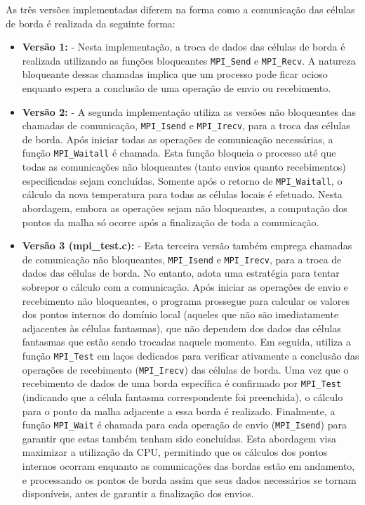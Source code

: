 \documentclass[a4paper, 12pt]{article}
\begin{document}
	As três versões implementadas diferem na forma como a comunicação das células de borda é realizada da seguinte forma:
	
	\begin{itemize}
		\item \textbf{Versão 1:} - Nesta implementação, a troca de dados das células de borda é realizada utilizando as funções bloqueantes \texttt{MPI\_Send} e \texttt{MPI\_Recv}. A natureza bloqueante dessas chamadas implica que um processo pode ficar ocioso enquanto espera a conclusão de uma operação de envio ou recebimento.
		
		\item \textbf{Versão 2:} - A segunda implementação utiliza as versões não bloqueantes das chamadas de comunicação, \texttt{MPI\_Isend} e \texttt{MPI\_Irecv}, para a troca das células de borda. Após iniciar todas as operações de comunicação necessárias, a função \texttt{MPI\_Waitall} é chamada. Esta função bloqueia o processo até que todas as comunicações não bloqueantes (tanto envios quanto recebimentos) especificadas sejam concluídas. Somente após o retorno de \texttt{MPI\_Waitall}, o cálculo da nova temperatura para todas as células locais é efetuado. Nesta abordagem, embora as operações sejam não bloqueantes, a computação dos pontos da malha só ocorre após a finalização de toda a comunicação.
		
		\item \textbf{Versão 3 (mpi\_test.c):} - Esta terceira versão também emprega chamadas de comunicação não bloqueantes, \texttt{MPI\_Isend} e \texttt{MPI\_Irecv}, para a troca de dados das células de borda. No entanto, adota uma estratégia para tentar sobrepor o cálculo com a comunicação. Após iniciar as operações de envio e recebimento não bloqueantes, o programa prossegue para calcular os valores dos pontos internos do domínio local (aqueles que não são imediatamente adjacentes às células fantasmas), que não dependem dos dados das células fantasmas que estão sendo trocadas naquele momento. Em seguida, utiliza a função \texttt{MPI\_Test} em laços dedicados para verificar ativamente a conclusão das operações de recebimento (\texttt{MPI\_Irecv}) das células de borda. Uma vez que o recebimento de dados de uma borda específica é confirmado por \texttt{MPI\_Test} (indicando que a célula fantasma correspondente foi preenchida), o cálculo para o ponto da malha adjacente a essa borda é realizado. Finalmente, a função \texttt{MPI\_Wait} é chamada para cada operação de envio (\texttt{MPI\_Isend}) para garantir que estas também tenham sido concluídas. Esta abordagem visa maximizar a utilização da CPU, permitindo que os cálculos dos pontos internos ocorram enquanto as comunicações das bordas estão em andamento, e processando os pontos de borda assim que seus dados necessários se tornam disponíveis, antes de garantir a finalização dos envios.
		
	\end{itemize}
	
\end{document}
